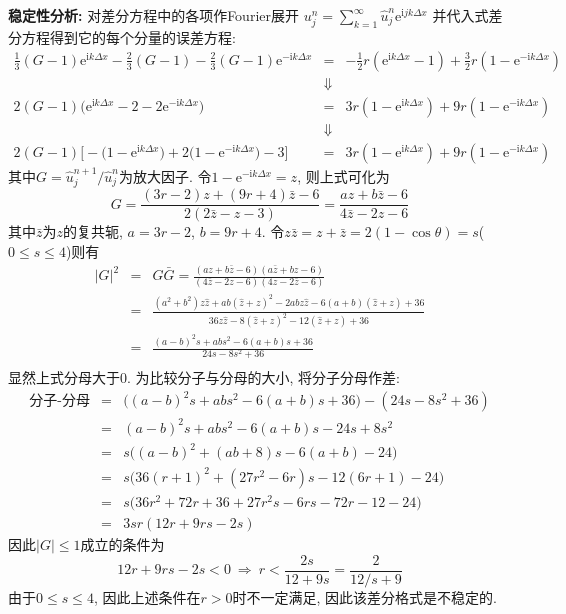 \begin{solution}
\vspace{1em}
\noindent\textbf{稳定性分析:} 对差分方程中的各项作Fourier展开
$u_{j}^{n}=\sum_{k=1}^{\infty}\hat{u}_{j}^{n}\mathrm{e}^{\mathrm{i}jk\Delta x}$
并代入式差分方程得到它的每个分量的误差方程:
{\setlength\arraycolsep{2pt}
\begin{eqnarray*}
\frac{1}{3}(G-1)\mathrm{e}^{\mathrm{i}k\Delta x}-\frac{2}{3}(G-1)-\frac{2}{3}(G-1)\mathrm{e}^{-\mathrm{i}k\Delta x} & = & -\frac{1}{2}r(\mathrm{e}^{\mathrm{i}k\Delta x}-1)+\frac{3}{2}r(1-\mathrm{e}^{-\mathrm{i}k\Delta x})\\
 & \Downarrow\\
2(G-1)\Big(\mathrm{e}^{\mathrm{i}k\Delta x}-2-2\mathrm{e}^{-\mathrm{i}k\Delta x}\Big) & = & 3r(1-\mathrm{e}^{\mathrm{i}k\Delta x})+9r(1-\mathrm{e}^{-\mathrm{i}k\Delta x})\\
 & \Downarrow\\
2(G-1)\Big[-\Big(1-\mathrm{e}^{\mathrm{i}k\Delta x}\Big)+2\Big(1-\mathrm{e}^{-\mathrm{i}k\Delta x}\Big)-3\Big] & = & 3r(1-\mathrm{e}^{\mathrm{i}k\Delta x})+9r(1-\mathrm{e}^{-\mathrm{i}k\Delta x})
\end{eqnarray*}}
其中$G=\hat{u}_{j}^{n+1}/\hat{u}_{j}^{n}$为放大因子. 令$1-\mathrm{e}^{-\mathrm{i}k\Delta x}=z$, 则上式可化为
\[
G=\frac{(3r-2)z+(9r+4)\bar{z}-6}{2(2\bar{z}-z-3)}=\frac{az+b\bar{z}-6}{4\bar{z}-2z-6}
\]
其中$\bar{z}$为$z$的复共轭, $a=3r-2$, $b=9r+4$. 令$z\bar{z}=z+\bar{z}=2(1-\cos\theta)=s$($0\leq s\leq 4$)则有
{\setlength\arraycolsep{2pt}
\begin{eqnarray*}
|G|^2&=&G\bar{G} = \frac{(az+b\bar{z}-6)(a\bar{z}+bz-6)}{(4\bar{z}-2z-6)(4z-2\bar{z}-6)}\\
     &=&\frac{(a^{2}+b^{2})z\hat{z}+ab(\hat{z}+z)^{2}-2abz\hat{z}-6(a+b)(\hat{z}+z)+36}
     {36z\hat{z}-8(\hat{z}+z)^{2}-12(\hat{z}+z)+36}\\
     &=& \frac{(a-b)^2s+abs^{2}-6(a+b)s+36}{24s-8s^{2}+36}\\
\end{eqnarray*}}
显然上式分母大于0. 为比较分子与分母的大小, 将分子分母作差:
\begin{eqnarray*}
\text{分子-分母}&=&\Big((a-b)^2s+abs^{2}-6(a+b)s+36\Big) - (24s-8s^{2}+36)\\
                &=&(a-b)^2s+abs^{2}-6(a+b)s- 24s+8s^{2}\\
                &=&s\Big((a-b)^2+(ab+8)s-6(a+b)- 24\Big)\\
                &=&s\Big(36(r+1)^2+(27r^2-6r)s-12(6r+1)- 24\Big)\\
                &=&s\Big(36r^2+72r+36+27r^2s-6rs-72r-12- 24\Big)\\
                &=&3sr(12r+9rs-2s)
\end{eqnarray*}
因此$|G|\leq 1$成立的条件为
\[
12r+9rs-2s<0\:\Rightarrow\: r<\frac{2s}{12+9s} = \frac{2}{12/s+9}
\]
由于$0\leq s\leq 4$, 因此上述条件在$r>0$时不一定满足, 因此该差分格式是不稳定的.
\end{solution} 
